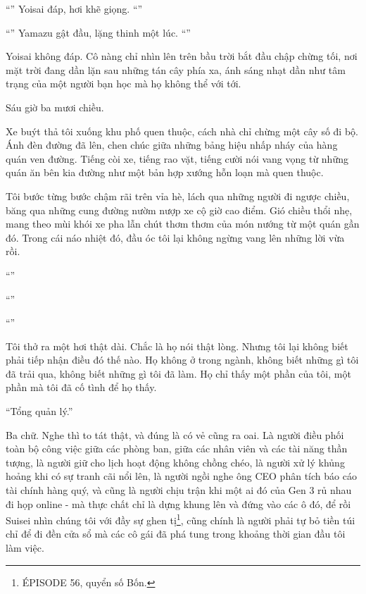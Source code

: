 \documentclass[../main.tex]{subfiles}
\begin{document}
``'' Yoisai đáp, hơi khẽ giọng. ``''

``'' Yamazu gật đầu, lặng thinh một lúc. ``''

Yoisai không đáp. Cô nàng chỉ nhìn lên trên bầu trời bắt đầu chập chừng tối, nơi mặt trời đang dần lặn sau những tán cây phía xa, ánh sáng nhạt dần như tâm trạng của một người bạn học mà họ không thể với tới.


Sáu giờ ba mươi chiều.

Xe buýt thả tôi xuống khu phố quen thuộc, cách nhà chỉ chừng một cây số đi bộ. Ánh đèn đường đã lên, chen chúc giữa những bảng hiệu nhấp nháy của hàng quán ven đường. Tiếng còi xe, tiếng rao vặt, tiếng cười nói vang vọng từ những quán ăn bên kia đường như một bản hợp xướng hỗn loạn mà quen thuộc.

Tôi bước từng bước chậm rãi trên vỉa hè, lách qua những người đi ngược chiều, băng qua những cung đường nườm nượp xe cộ giờ cao điểm. Gió chiều thổi nhẹ, mang theo mùi khói xe pha lẫn chút thơm thơm của món nướng từ một quán gần đó. Trong cái náo nhiệt đó, đầu óc tôi lại không ngừng vang lên những lời vừa rồi.

``''

``''

``''

Tôi thở ra một hơi thật dài. Chắc là họ nói thật lòng. Nhưng tôi lại không biết phải tiếp nhận điều đó thế nào. Họ không ở trong ngành, không biết những gì tôi đã trải qua, không biết những gì tôi đã làm. Họ chỉ thấy một phần của tôi, một phần mà tôi đã cố tình để họ thấy.

``Tổng quản lý.''

Ba chữ. Nghe thì to tát thật, và đúng là có vẻ cũng ra oai. Là người điều phối toàn bộ công việc giữa các phòng ban, giữa các nhân viên và các tài năng thần tượng, là người giữ cho lịch hoạt động không chồng chéo, là người xử lý khủng hoảng khi có sự tranh cãi nổi lên, là người ngồi nghe ông CEO phân tích báo cáo tài chính hàng quý, và cũng là người chịu trận khi một ai đó của Gen 3 rủ nhau đi họp online - mà thực chất chỉ là dựng khung lên và đứng vào các ô đó, để rồi Suisei nhìn chúng tôi với đầy sự ghen tị\footnote{{\flaregothic ÉPISODE 56}, quyển số Bốn.}, cũng chính là người phải tự bỏ tiền túi chỉ để đi đền cửa sổ mà các cô gái đã phá tung trong khoảng thời gian đầu tôi làm việc.
\end{document}
